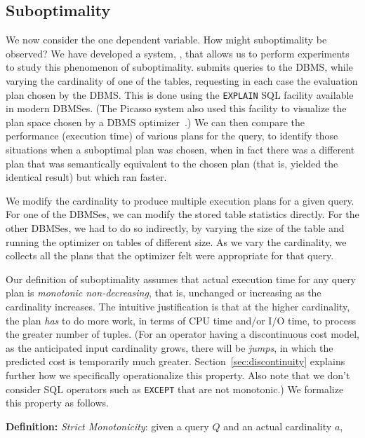 \documentclass[prodmode,acmtods]{acmsmall}
\def\azdb{\doubleblind{\hbox{\sc AZDBLab}}{\hbox{\sc DBLab}}}
\begin{document}
\subsection{Suboptimality}\label{sec:suboptimality}
We now consider the one dependent variable.
How might suboptimality be observed? We have developed a system, \azdb, that
allows us to perform experiments to study this phenomenon of suboptimality.
\hbox{\azdb} submits queries to the \hbox{DBMS}, while varying
the cardinality of one of the tables,
requesting in each case the evaluation plan chosen by the \hbox{DBMS}.
This is done using the
{\tt EXPLAIN} SQL facility available in modern \hbox{DBMSes}. (The Picasso system
also used this facility to visualize the plan space chosen by a \hbox{DBMS}
optimizer~\cite{harish07,Haritsa10}.) We can then compare
the performance (execution time) of various plans for the query, to identify those
situations when a suboptimal plan was chosen, when in fact there was a
different plan that was semantically equivalent to the chosen plan (that is,
yielded the identical result) but which ran faster.

We modify the cardinality to produce multiple execution
plans for a given query. For one of the \hbox{DBMSes}, we can modify the stored
table statistics directly. For the other \hbox{DBMSes}, we had to do so indirectly,
by varying the size of the table and running the optimizer on tables of
different size. As we vary the cardinality, we
collects all the plans that the optimizer felt were appropriate for that
query. 

Our definition of suboptimality assumes that
actual execution time for any query plan is {\em monotonic non-decreasing}, that is,
unchanged or increasing as the cardinality increases.  The intuitive justification is that at the higher
cardinality, the plan {\em has} to do more work, in terms of CPU time and/or
I/O time, to process the greater number of tuples. (For an operator having a discontinuous cost model, as the
anticipated input cardinality grows, there will be {\em jumps}, in which the
predicted cost is temporarily much greater. Section~\ref{sec:discontinuity}
explains further how we specifically
operationalize this property. Also note that we don't consider SQL
operators such as {\tt EXCEPT} that are not monotonic.)
We formalize this property as follows.

\vspace{1em}\noindent
{\bf Definition:} {\em Strict Monotonicity}: given a query $Q$ and an actual
cardinality $a$,
\end{document}
